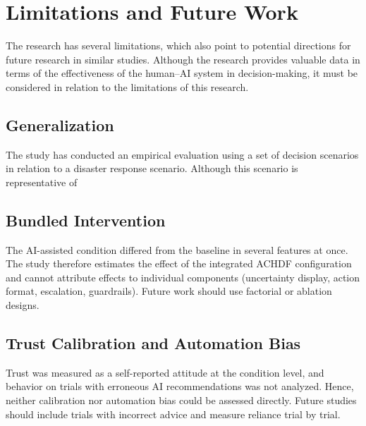 \documentclass[journal]{IEEEtran}
\theoremstyle{plain}
\theoremstyle{definition}
\providecommand{\DIFaddtex}[1]{{\protect\color{blue} \sf #1}} %
\providecommand{\DIFdeltex}[1]{{\protect\color{red} \scriptsize #1}} %
\providecommand{\DIFaddbegin}{} %
\providecommand{\DIFaddend}{} %
\providecommand{\DIFdelbegin}{} %
\providecommand{\DIFdelend}{} %
\providecommand{\DIFadd}[1]{\texorpdfstring{\DIFaddtex{#1}}{#1}} %
\providecommand{\DIFdel}[1]{\texorpdfstring{\DIFdeltex{#1}}{}} %
\newcommand{\DIFscaledelfig}{0.5}
\newlength{\DIFdelgraphicswidth} %
\newlength{\DIFdelgraphicsheight} %
\newcommand{\DIFaddincludegraphics}[2][]{{\color{blue}\fbox{\DIFOincludegraphics[#1]{#2}}}} %
\newcommand{\DIFdelincludegraphics}[2][]{%
\sbox{\DIFdelgraphicsbox}{\DIFOincludegraphics[#1]{#2}}%
\settoboxwidth{\DIFdelgraphicswidth}{\DIFdelgraphicsbox} %
\settoboxtotalheight{\DIFdelgraphicsheight}{\DIFdelgraphicsbox} %
\scalebox{\DIFscaledelfig}{%
\parbox[b]{\DIFdelgraphicswidth}{\usebox{\DIFdelgraphicsbox}\\[-\baselineskip] \rule{\DIFdelgraphicswidth}{0em}}\llap{\resizebox{\DIFdelgraphicswidth}{\DIFdelgraphicsheight}{%
\setlength{\unitlength}{\DIFdelgraphicswidth}%
\begin{picture}(1,1)%
\thicklines\linethickness{2pt} %
{\color[rgb]{1,0,0}\put(0,0){\framebox(1,1){}}}%
{\color[rgb]{1,0,0}\put(0,0){\line( 1,1){1}}}%
{\color[rgb]{1,0,0}\put(0,1){\line(1,-1){1}}}%
\end{picture}%
}\hspace*{3pt}}} %
} %
\DeclareRobustCommand{\DIFaddbegin}{\DIFOaddbegin \let\includegraphics\DIFaddincludegraphics} %
\DeclareRobustCommand{\DIFaddend}{\DIFOaddend \let\includegraphics\DIFOincludegraphics} %
\DeclareRobustCommand{\DIFdelbegin}{\DIFOdelbegin \let\includegraphics\DIFdelincludegraphics} %
\DeclareRobustCommand{\DIFdelend}{\DIFOaddend \let\includegraphics\DIFOincludegraphics} %
\begin{document}
    \section{Limitations and Future Work}
    \DIFdelbegin \DIFdel{The research has several limitations, which also point to potential directions for future research in similar studies. Although the research provides valuable data in terms of the effectiveness of the human--AI system in decision-making, it must be considered in relation to the limitations of this research. }\DIFdelend \DIFaddbegin \label{sec:limitations}
\DIFaddend 

    \DIFdelbegin \subsection{\DIFdel{Generalization}}
\addtocounter{subsection}{-1}%
\DIFdel{The study has conducted an empirical evaluation using a set of decision scenarios in relation to a disaster response scenario. Although this scenario is representative of }\DIFdelend \DIFaddbegin \subsection{\DIFadd{Bundled Intervention}}
    \DIFadd{The AI-assisted condition differed from the baseline in several features at once. The study therefore estimates the effect of the integrated ACHDF configuration and cannot attribute effects to individual components (uncertainty display, action format, escalation, guardrails). Future work should use factorial or ablation designs.
}

    \subsection{\DIFadd{Trust Calibration and Automation Bias}}
    \DIFadd{Trust was measured as a self-reported attitude at the condition level, and behavior on trials with erroneous AI recommendations was not analyzed. Hence, neither calibration nor automation bias could be assessed directly. Future studies should include trials with incorrect advice and measure reliance trial by trial.
}
\end{document}
